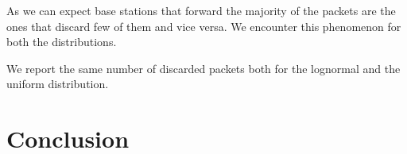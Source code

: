 \documentclass{report}
\begin{document}
\begin{flushleft}
As we can expect base stations that forward the majority of the packets are the ones that discard few of them and vice versa. We encounter this phenomenon for both the distributions.
\vspace{1em}

We report the same number of discarded packets both for the lognormal and the uniform distribution.
\end{flushleft}


\chapter{Conclusion}
\appendix
\end{document}
